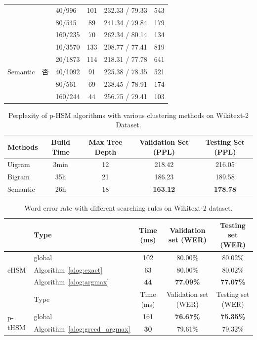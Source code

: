 \begin{table}[t]
\begin{tabular}{lclccc}
    &&40/996 &101&232.33 / 79.33&543\\
    &&80/545 &89&241.34 / 79.84&179\\
    &&160/235 &70&262.34 / 80.14&134\\
  \midrule
  \multirow{5}{*}{Semantic}  &\multirow{5}{*}{否} &10/3570 &133&208.77 / 77.41&819\\
    & &20/1873 &114&218.31 / 77.78&641\\
    & &40/1092 &91&225.38 / 78.35&521\\
    & &80/561 &69&238.45 / 78.91&174\\
    & &160/244 &44&256.75 / 79.41&103\\
\bottomrule
  \end{tabular}
\end{table}
\begin{table}[t]
  \centering
   \caption{Perplexity of p-HSM algorithms with various clustering methods on Wikitext-2 Dataset.\label{table:p-thsm}}
  \begin{tabular}{lcccc} \toprule
  Methods   &Build Time&Max Tree Depth &Validation Set (PPL) & Testing Set (PPL)  \\ \midrule
  Uigram  &3min&12 &218.42& 216.05     \\
  Bigram  &35h&21& 186.23& 189.58\\
  Semantic &26h &18& \textbf{163.12} & \textbf{178.78}\\
\bottomrule
  \end{tabular}
\end{table}

\begin{table}[t]
  \centering
  \caption{Word error rate with different searching rules on Wikitext-2 dataset.\label{tab:search}}
\begin{tabular}{llccc}
  \toprule
   & Type&Time (ms)&Validation set (WER)& Testing set (WER)\\ \midrule
  \multirow{3}{*}{cHSM} &global&102& 80.00\%& 80.02\%\\
        &Algorithm~\ref{alog:exact}&63& 80.00\%& 80.02\%\\
        &Algorithm~\ref{alog:argmax}&\textbf{44}&\textbf{ 77.09\%}&\textbf{ 77.07\%}\\\midrule \midrule
        & Type&Time (ms)&Validation set (WER)& Testing set (WER)\\ \midrule
  \multirow{2}{*}{p-tHSM}  &global&161& \textbf{76.67\%}&\textbf{75.35\%}\\
        &Algorithm~\ref{alog:greed_argmax}&\textbf{30} & 79.61\%&79.32\%\\
  \bottomrule
\end{tabular}
\end{table}

